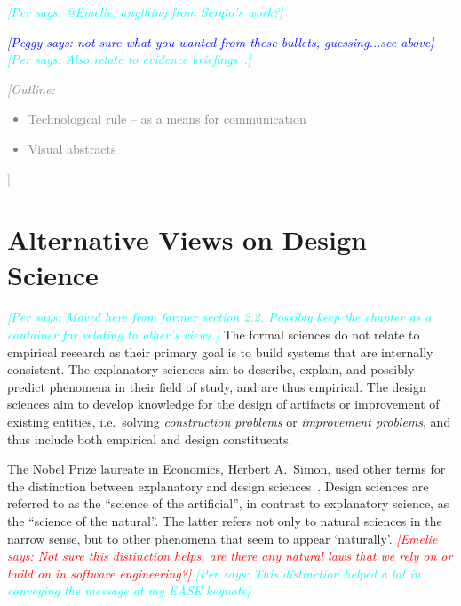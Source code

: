 \documentclass[graybox]{svmult}
\newcommand{\emelie}[1]{\textcolor{red}{{\it [Emelie says: #1]}}}
\newcommand{\peggy}[1]{\textcolor{blue}{{\it [Peggy says: #1]}}}
\newcommand{\per}[1]{\textcolor{cyan}{{\it [Per says: #1]}}}
\newcommand{\outline}[1]{\textcolor{gray}{{\it [Outline: #1]}}}
\newcommand{\emelie}[1]{}
\newcommand{\peggy}[1]{}
\newcommand{\per}[1]{}
\newcommand{\outline}[1]{}
\begin{document}
\per{@Emelie, anything from Sergio's work?}

\peggy{ not sure what you wanted from these bullets, guessing...see above}
\per{Also relate to evidence briefings~\cite{cartaxo_evidence_2016}.}
\outline{
\begin{itemize}
\item Technological rule -- as a means for communication
\item Visual abstracts
\end{itemize}
}


\section{Alternative Views on Design Science}
\per{Moved here from former section 2.2. Possibly keep the chapter as a container for relating to other's views.}
The formal sciences do not relate to empirical research as their primary goal is to build systems that are internally consistent. The explanatory sciences aim to describe, explain, and possibly predict phenomena in their field of study, and are thus empirical. The design sciences aim to develop knowledge for the design of artifacts or improvement of existing entities, i.e.\ solving \emph{construction problems} or  \emph{improvement problems}, and thus include both empirical and design constituents. 

The Nobel Prize laureate in Economics, Herbert A.\ Simon, used other terms for the distinction between explanatory and design sciences~\cite{Simons69}. Design sciences are referred to as the ``science of the artificial'', in contrast to explanatory science, as the ``science of the natural''. The latter refers not only to natural sciences in the narrow sense, but to other phenomena that seem to appear `naturally'. %
\emelie{Not sure this distinction helps, are there any natural laws that we rely on or build on in software engineering?} \per{This distinction helped a lot in conveying the message at my EASE keynote}
\end{document}
